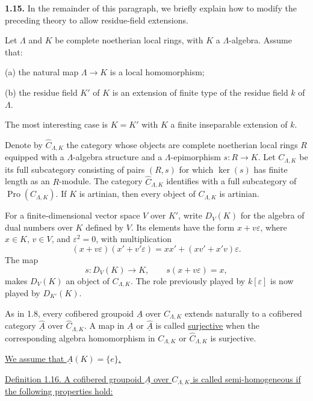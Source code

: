
\textbf{1.15.} In the remainder of this paragraph, we briefly explain
how to modify the preceding theory to allow residue-field extensions.

Let $\Lambda$ and $K$ be complete noetherian local rings, with $K$ a
$\Lambda$-algebra. Assume that:

(a) the natural map $\Lambda\longrightarrow K$ is a local
homomorphism;

(b) the residue field $K'$ of $K$ is an extension of finite type of
the residue field $k$ of $\Lambda$.

The most interesting case is $K=K'$ with $K$ a finite inseparable
extension of $k$.

Denote by $\widehat C_{\Lambda,K}$ the category whose objects are
complete noetherian local rings $R$ equipped with a
$\Lambda$-algebra structure and a $\Lambda$-epimorphism
$s:R\longrightarrow K$. Let $C_{\Lambda,K}$ be its full subcategory
consisting of pairs $(R,s)$ for which $\ker(s)$ has finite length as
an $R$-module. The category $\widehat C_{\Lambda,K}$ identifies with
a full subcategory of $\operatorname{Pro}(C_{\Lambda,K})$. If $K$ is
artinian, then every object of $C_{\Lambda,K}$ is artinian.

For a finite-dimensional vector space $V$ over $K'$, write $D_V(K)$
for the algebra of dual numbers over $K$ defined by $V$. Its elements
have the form $x+v\varepsilon$, where $x\in K$, $v\in V$, and
$\varepsilon^2=0$, with multiplication
\[
 (x+v\varepsilon)(x'+v'\varepsilon)
 =xx'+(xv'+x'v)\varepsilon.
\]
The map
\[
 s:D_V(K)\longrightarrow K,
 \qquad s(x+v\varepsilon)=x,
\]
makes $D_V(K)$ an object of $C_{\Lambda,K}$. The role previously
played by $k[\varepsilon]$ is now played by $D_{K'}(K)$.

As in 1.8, every cofibered groupoid $\underline A$ over
$C_{\Lambda,K}$ extends naturally to a cofibered category
$\widehat{\underline A}$ over $\widehat C_{\Lambda,K}$. A map in
$\underline A$ or $\widehat{\underline A}$ is called
\underline{surjective} when the corresponding algebra homomorphism
in $C_{\Lambda,K}$ or $\widehat C_{\Lambda,K}$ is surjective.


\underline{We assume that $\underline A(K)=\{e\}$.}

\underline{Definition 1.16. A cofibered groupoid $\underline A$ over
$C_{\Lambda,K}$ is called semi-homogeneous if the following
properties hold:}

